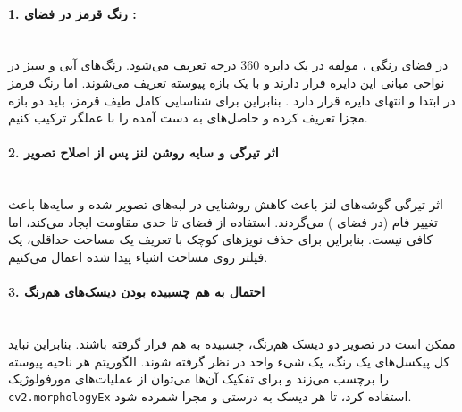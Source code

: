 \documentclass{article}
\begin{document}
\paragraph{1. رنگ قرمز در فضای :}\mbox{}\\
در فضای رنگی ، مولفه  در یک دایره 360 درجه تعریف می‌شود. رنگ‌های آبی و سبز در نواحی میانی این دایره قرار دارند و با یک بازه پیوسته تعریف می‌شوند. اما رنگ قرمز در ابتدا و انتهای دایره قرار دارد . بنابراین برای شناسایی کامل طیف قرمز، باید دو بازه مجزا تعریف کرده و حاصل‌های به دست آمده را با عملگر  ترکیب کنیم.
\paragraph{2. اثر تیرگی و سایه روشن لنز پس از اصلاح تصویر}\mbox{}\\
اثر تیرگی گوشه‌های لنز باعث کاهش روشنایی در لبه‌های تصویر شده و سایه‌ها باعث تغییر فام (در فضای ) می‌گردند. استفاده از فضای  تا حدی مقاومت ایجاد می‌کند، اما کافی نیست. بنابراین برای حذف نویزهای کوچک با تعریف یک مساحت حداقلی، یک فیلتر روی مساحت اشیاء پیدا شده اعمال می‌کنیم.

\paragraph{3. احتمال به هم چسبیده بودن دیسک‌های هم‌رنگ}\mbox{}\\
ممکن است در تصویر دو دیسک هم‌رنگ، چسبیده به هم قرار گرفته باشند. بنابراین نباید کل پیکسل‌های یک رنگ، یک شیء واحد در نظر گرفته شوند. 
الگوریتم  هر ناحیه پیوسته را برچسب‌  می‌زند و برای تفکیک آن‌ها می‌توان از عملیات‌های مورفولوژیک \texttt{cv2.morphologyEx} استفاده کرد، تا هر دیسک به درستی و مجرا شمرده شود. 
\end{document}

